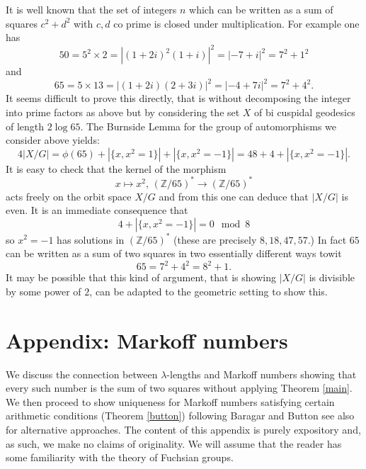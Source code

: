 \documentclass[12pt,a4paper]{amsart}
\def\ZZ{\mathbb{Z}}
\begin{document}
It is well known that the set of integers $n$ 
which can be written as a sum of squares 
$c^2 + d^2$ with $c,d$ co prime is closed under multiplication.
For example one has
$$50 = 5^2 \times 2 = | (1+2i)^2 (1+i) |^2 = |  -7 + i |^2 = 7^2 + 1^2 $$
and
$$65 = 5 \times 13 = | (1+2i)(2+3 i) |^2 = |  -4 + 7i |^2 = 7^2 + 4^2.$$
It seems difficult to prove this directly, 
that is without decomposing the integer into prime factors as above 
but by considering  the set $X$ of bi cuspidal  geodesics of length $2\log 65$.
The Burnside Lemma for the group of automorphisms we consider above yields:
$$4 |X/G|   = \phi(65)+  |\{ x, x^2 = 1 \}| + |\{ x, x^2 = -1 \}| = 48 + 4 +  |\{ x, x^2 = -1 \}|.$$
It is easy to check that the 
kernel of the morphism 
$$x \mapsto x^2,\, (\ZZ/65)^* \rightarrow (\ZZ/65)^*$$
acts freely on the orbit space $X/G$
and from this one can deduce that $|X/G|$ is even.
It is an immediate consequence that 
$$ 4 +  |\{ x, x^2 = -1 \}| = 0 \mod 8 $$
so $x^2 = -1$ 
has solutions in $(\ZZ/65)^*$
(these are precisely  $8,18,47,57$.)
In fact $65$ can be written as a sum of two  squares 
in two essentially different ways towit
$$ 65 =  7^2 + 4^2 = 8^2 + 1.$$
It may be possible  that this kind of argument,
that is showing $|X/G|$ is divisible by some power of $2$,
can be adapted to the geometric setting to show this.



%
%
%


\section{Appendix: Markoff numbers}

We discuss the connection between $\lambda$-lengths
and Markoff numbers showing that every such number is 
the sum of two squares without applying Theorem \ref{main}.
We then proceed to show uniqueness for Markoff numbers
satisfying certain arithmetic conditions (Theorem \ref{button})
 following Baragar and Button
 see also \cite{mong,zhang,zhang2} for alternative approaches.
The content of this appendix is purely expository and,
as such,
we make no claims of originality.
We will assume that the reader has some familiarity with 
the theory of Fuchsian groups.
\end{document}
